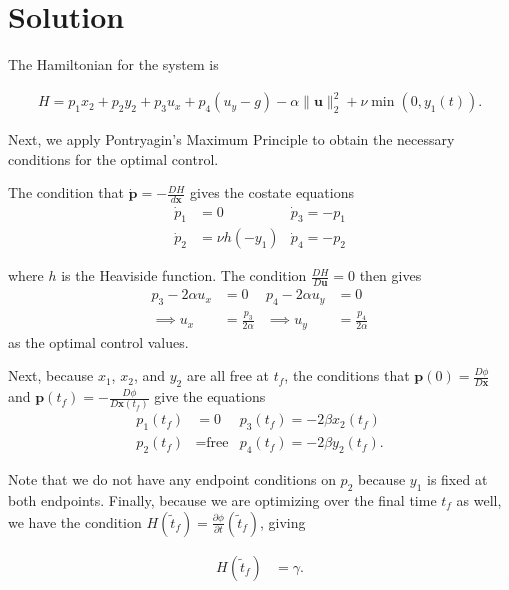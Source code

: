 \documentclass{article}
\begin{document}
\section{Solution}\label{solution}

The Hamiltonian for the system is

\begin{align}
    H = p_1 x_2 + p_2 y_2 + p_3 u_x + p_4(u_y - g) - \alpha \|\mathbf{u}\|_2^2 + \nu\min(0, y_1(t)).
\end{align}

Next, we apply Pontryagin's Maximum Principle to obtain the necessary conditions for the optimal control.

The condition that $\dot{\mathbf{p}}= -\frac{D H}{d \mathbf{x}}$ gives the costate equations
\begin{align}
    \dot{p}_1 &=0  & \dot{p}_3 = -p_1 \\[1ex]
    \dot{p}_2 & = \nu h(-y_1) & \dot{p}_4 = -p_2
\end{align}

where $h$ is the Heaviside function. The condition $\frac{D H}{D \mathbf{u}} = 0$ then gives
\begin{align}
    p_3 - 2 \alpha u_x &= 0 & p_4 - 2 \alpha u_y &= 0 \\
    \implies u_x &= \frac{p_3}{2\alpha} & \implies u_y &= \frac{p_4}{2\alpha}
\end{align}
as the optimal control values.

Next, because $x_1$, $x_2$, and $y_2$ are all free at $t_f$, the conditions that $\mathbf{p}(0) = \frac{D \phi }{D \mathbf{x}}$ and $\mathbf{p}(t_f)= -\frac{D \phi }{D\mathbf{x}(t_f)}$ give the equations
\begin{align}
    p_1(t_f) & = 0 & p_3(t_f) = -2\beta x_2(t_f)\\[1ex]
    p_2(t_f) & = \text{free} & p_4(t_f) = -2\beta y_2(t_f).
\end{align}

Note that we do not have any endpoint conditions on $p_2$ because $y_1$ is fixed at both endpoints.
Finally, because we are optimizing over the final time $t_f$ as well, we have the condition $H(\tilde{t}_f) = \frac{\partial \phi }{\partial t}(\tilde{t}_f)$, giving

\begin{align}
    H(\tilde{t}_f) &= \gamma.
\end{align}
\end{document}
